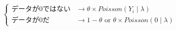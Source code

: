 \begin{equation}
	\left\{ \begin{array}{cc} \mbox{データが0ではない} & \to \theta \times Poisson(Y_i\mid\lambda)                    \\
             \mbox{データが0だ}         & \to 1-\theta \mbox{ or } \theta \times Poisson(0\mid\lambda)\end{array} \right.
\end{equation}
